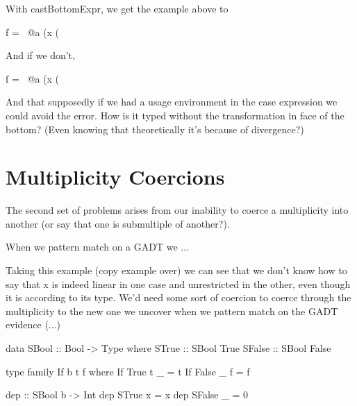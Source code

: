 \documentclass[a4paper, draft]{article}
\begin{document}
With castBottomExpr, we get the example above to
\begin{code}
    f = \ @a (x (%
\end{code}
And if we don't, 
\begin{code}
    f = \ @a (x (%
\end{code}
And that supposedly if we had a usage environment in the case expression we
could avoid the error. How is it typed without the transformation in face
of the bottom? (Even knowing that theoretically it's because of divergence?)



\section{Multiplicity Coercions}

The second set of problems arises from our inability to coerce a multiplicity
into another (or say that one is submultiple of another?).

When we pattern match on a GADT we ...

Taking this example (copy example over) we can see that we don't know how to say
that x is indeed linear in one case and unrestricted in the other, even though
it is according to its type. We'd need some sort of coercion to coerce through
the multiplicity to the new one we uncover when we pattern match on the GADT
evidence (...)

\begin{code}
data SBool :: Bool -> Type where
  STrue :: SBool True
  SFalse :: SBool False

type family If b t f where
  If True t _ = t
  If False _ f = f

dep :: SBool b -> Int %
dep STrue x = x
dep SFalse _ = 0
\end{code}
\end{document}
